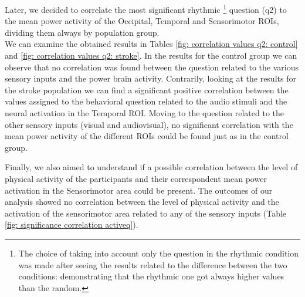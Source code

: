 Later, we decided to correlate the most significant rhythmic \footnote{The choice of taking into account only the question in the rhythmic condition was made after seeing the results related to the difference between the two conditions: demonstrating that the rhythmic one got always higher values than the random.} question (q2) to the mean power activity of the Occipital, Temporal and Sensorimotor ROIs, dividing them always by population group. \\
We can examine the obtained results in Tables \ref{fig: correlation values q2: control} and \ref{fig: correlation values q2: stroke}. In the results for the control group we can observe that no correlation was found between the question related to the various sensory inputs and the power brain activity. Contrarily, looking at the results for the stroke population we can find a significant positive correlation between the values assigned to the behavioral question related to the audio stimuli and the neural activation in the Temporal ROI. Moving to the question related to the other sensory inputs (visual and audiovisual), no significant correlation with the mean power activity of the different ROIs could be found just as in the control group.

Finally, we also aimed to understand if a possible correlation between the level of physical activity of the participants and their correspondent mean power activation in the Sensorimotor area could be present. The outcomes of our analysis showed no correlation between the level of physical activity and the activation of the sensorimotor area related to any of the sensory inputs (Table \ref{fig: significance correlation activeq}). 


